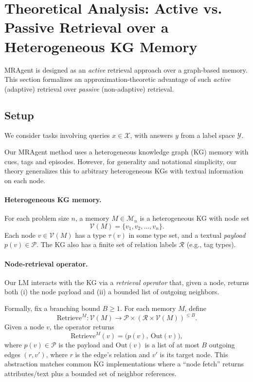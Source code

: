 \documentclass{llmxive}
\begin{document}
\section{Theoretical Analysis: Active vs. Passive Retrieval over a Heterogeneous KG Memory}
\label{app:active-vs-passive-separation}

MRAgent is designed as an \emph{active} retrieval approach over a graph-based memory. This section formalizes an approximation-theoretic advantage of such
\emph{active} (adaptive) retrieval over \emph{passive} (non-adaptive) retrieval.


\subsection{Setup}

We consider tasks involving queries $x \in \mathcal{X}$, with answers $y$ from a label space \(\mathcal{Y}\).

Our MRAgent method uses a heterogeneous knowledge graph (KG) memory with cues, tags and episodes. However, for generality and notational simplicity, our theory generalizes this to arbitrary heterogeneous KGs with textual information on each node.

\paragraph{Heterogeneous KG memory.}
For each problem size \(n\), a memory \(M \in \mathcal{M}_n\) is a heterogeneous KG
with node set
\[
  \mathcal{V}(M) = \{v_1, v_2, \dots, v_n\}.
\]
Each node \(v \in \mathcal{V}(M)\) has a type \(\tau(v)\) in some type set, and a textual \emph{payload} $p(v) \in \mathcal{P}$.
The KG also has a finite set of relation labels
\(\mathcal{R}\) (e.g., tag types).

\paragraph{Node-retrieval operator.}
Our LM interacts with the KG via a \emph{retrieval operator} that, given a node, returns
both (i) the node payload and (ii) a bounded list of outgoing neighbors.

Formally, fix a branching bound \(B \ge 1\). For each memory \(M\), define
\[
  \mathrm{Retrieve}^M : \mathcal{V}(M) \to \mathcal{P} \times (\mathcal{R}\times \mathcal{V}(M))^{\le B}.
\]
Given a node \(v\), the operator returns
\[
  \mathrm{Retrieve}^M(v) = \bigl(p(v),\ \mathrm{Out}(v)\bigr),
\]
where \(p(v)\in\mathcal{P}\) is the payload and \(\mathrm{Out}(v)\) is a list of at most \(B\) outgoing edges \((r,v')\), where $r$ is the edge's relation and $v'$ is its target node. This abstraction matches common
KG implementations where a ``node fetch'' returns attributes/text plus a bounded set of
neighbor references.
\end{document}
